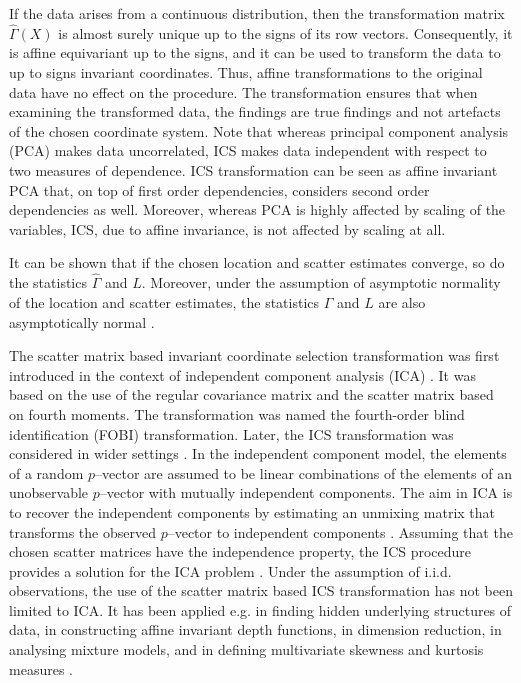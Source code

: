 \documentclass{llncs}
\begin{document}
If the data arises from a continuous distribution, then the transformation matrix $\hat{\Gamma}\left(X\right)$ is almost surely unique up to the signs of its row vectors. Consequently, it is affine equivariant up to the signs, and it can be used to transform the data to up to signs invariant coordinates. Thus, affine  transformations to the original data have no  effect on the procedure. The transformation ensures that when examining the transformed data, the findings are true findings and not artefacts of the chosen coordinate system. 
Note that whereas principal component analysis (PCA) makes data uncorrelated, ICS makes data independent with respect to two measures of dependence. ICS transformation can be seen as affine invariant PCA that, on top of first order dependencies, considers second order dependencies as well. Moreover, whereas PCA is highly affected by scaling of the variables,  ICS, due to affine invariance, is not affected by scaling at all.

It can be shown that if the chosen location and scatter estimates converge, so do the statistics $\hat{\Gamma}$ and $L.$ Moreover, under the assumption of asymptotic normality of the location and scatter estimates, the statistics $\hat{\Gamma}$ and $L$ are also asymptotically normal \cite{i4c,i4,i8}.

The scatter matrix based invariant coordinate selection transformation was first introduced in the context of independent component analysis (ICA) \cite{FOBI}. It was based on the use of the regular covariance matrix and the scatter matrix based on fourth moments. The transformation was named the fourth-order blind identification (FOBI) transformation. Later, the ICS transformation was considered in wider settings \cite{TY}. In the independent component model, the elements of a random $p$--vector are assumed to be linear combinations of the elements of an unobservable $p$--vector with mutually independent components. The aim in ICA is to recover the independent components by estimating an unmixing matrix that transforms the observed $p$--vector to  independent components \cite{IN}. Assuming that the chosen scatter matrices have the independence property, the ICS procedure provides a solution for the ICA problem \cite{FOBI,i4,Nordhausen:2008,Oja:2006}. Under the assumption of i.i.d. observations, the use of the scatter matrix based ICS transformation has not  been limited to ICA. It has been applied e.g. in finding hidden underlying structures of data, in constructing affine invariant depth functions, in dimension reduction, in analysing mixture models, and in defining multivariate skewness and kurtosis measures \cite{i4c,i4,i8,Serfling2010,TY}.
\end{document}
